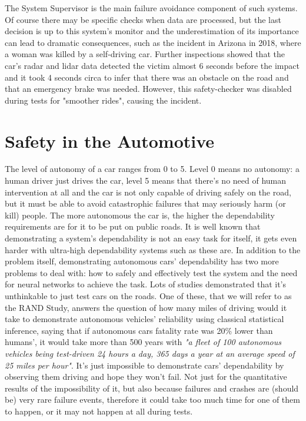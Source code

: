 The System Supervisor is the main failure avoidance component of such systems. Of course there may be specific checks when data are processed, but the last decision is up to this system's monitor and the underestimation of its importance can lead to dramatic consequences, such as the incident in Arizona in 2018, where a woman was killed by a self-driving car.\cite{arizuber} Further inspections showed that the car's radar and lidar data detected the victim almost 6 seconds before the impact and it took 4 seconds circa to infer that there was an obstacle on the road and that an emergency brake was needed. However, this safety-checker was disabled during tests for "smoother rides", causing the incident.\cite{govarizuber}



\section{Safety in the Automotive}

The level of autonomy of a car ranges from 0 to 5. Level 0 means no autonomy: a human driver just drives the car, level 5 means that there's no need of human intervention at all and the car is not only capable of driving safely on the road, but it must be able to avoid catastrophic failures that may seriously harm (or kill) people.
The more autonomous the car is, the higher the dependability requirements are for it to be put on public roads.
It is well known that demonstrating a system's dependability is not an easy task for itself, it gets even harder with ultra-high dependability systems such as these are. In addition to the problem itself, demonstrating autonomous cars' dependability has two more problems to deal with: how to safely and effectively test the system and the need for neural networks to achieve the task.\newline 
Lots of studies demonstrated that it's unthinkable to just test cars on the roads. One of these, that we will refer to as the RAND Study, answers the question of how many miles of driving would it take to demonstrate autonomous vehicles' reliability using classical statistical inference, saying that if autonomous cars fatality rate was 20\% lower than humans', it would take more than 500 years with \textsl{"a fleet of 100 autonomous vehicles being test-driven 24 hours a day, 365 days a year at an average speed of 25 miles per hour"}.\cite{randstudy} It's just impossible to demonstrate cars' dependability by observing them driving and hope they won't fail. Not just for the quantitative results of the impossibility of it, but also because failures and crashes are (should be) very rare failure events, therefore it could take too much time for one of them to happen, or it may not happen at all during tests.\newline\newline

